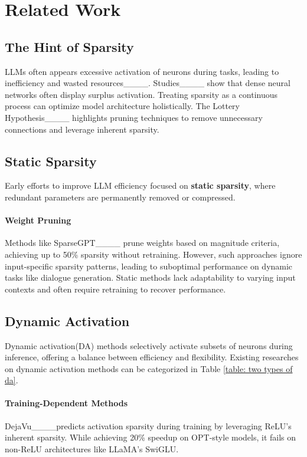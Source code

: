 \section{Related Work}
\label{app: related work}
\subsection{The Hint of Sparsity}
LLMs often appears excessive activation of neurons during tasks, leading to inefficiency and wasted resources____. Studies____ show that dense neural networks often display surplus activation. Treating sparsity as a continuous process can optimize model architecture holistically. The Lottery Hypothesis____ highlights pruning techniques to remove unnecessary connections and leverage inherent sparsity.

\subsection{Static Sparsity}
Early efforts to improve LLM efficiency focused on \textbf{static sparsity}, where redundant parameters are permanently removed or compressed.

\paragraph{Weight Pruning} Methods like SparseGPT____ prune weights based on magnitude criteria, achieving up to 50\% sparsity without retraining. However, such approaches ignore input-specific sparsity patterns, leading to suboptimal performance on dynamic tasks like dialogue generation. Static methods lack adaptability to varying input contexts and often require retraining to recover performance.  

\subsection{Dynamic Activation}
Dynamic activation(DA) methods selectively activate subsets of neurons during inference, offering a balance between efficiency and flexibility. Existing researches on dynamic activation methods can be categorized in Table \ref{table: two types of da}.

\paragraph{Training-Dependent Methods}
DejaVu____predicts activation sparsity during training by leveraging ReLU’s inherent sparsity. While achieving 20\% speedup on OPT-style models, it fails on non-ReLU architectures like LLaMA’s SwiGLU.

